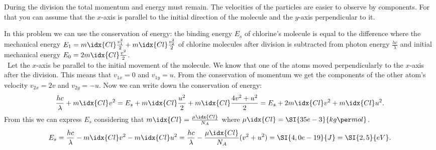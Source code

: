 \hinteng
During the division the total momentum and energy must remain. The velocities of the particles are easier to observe by components. For that you can assume that the $x$-axis is parallel to the initial direction of the molecule and the $y$-axis perpendicular to it.

\solueng
In this problem we can use the conservation of energy: the binding energy $E_s$ of chlorine’s molecule is equal to the difference where the mechanical energy $E_1 = m\idx{Cl} \frac{v_1^2}{2} + m\idx{Cl} \frac{v_2^2}{2}$ of chlorine molecules after division is subtracted from photon energy $\frac{hc}{\lambda}$ and initial mechanical energy $E_0 = 2m\idx{Cl} \frac{v^2}{2} $.\\\    
Let the $x$-axis be parallel to the initial movement of the molecule. We know that one of the atoms moved perpendicularly to the $x$-axis after the division. This means that $v_{1x} = 0$ and $v_{1y} = u$. From the conservation of momentum we get the components of the other atom’s velocity $v_{2x} = 2 v$ and $v_{2y} = -u$. Now we can write down the conservation of energy:
$$
	\frac{hc}{\lambda} + m\idx{Cl} v^2  = E_s + m\idx{Cl} \frac{u^2}{2} + m\idx{Cl} \frac{4v^2 + u^2}{2} = E_s + 2 m\idx{Cl} v^2 + m\idx{Cl} u^2.
$$ 
From this we can express $E_s$ considering that $m\idx{Cl} = \frac{\mu\idx{Cl}}{N_A}$ where $\mu\idx{Cl} = \SI{35e-3}{kg\per mol}$.
$$ E_s = \frac{hc}{\lambda} - m\idx{Cl} v^2 - m\idx{Cl} u^2 = \frac{hc}{\lambda} - \frac{\mu\idx{Cl}}{N_A} (v^2 + u^2) = \SI{4,0e-19}{J} = \SI{2,5}{eV}.
$$
\probend